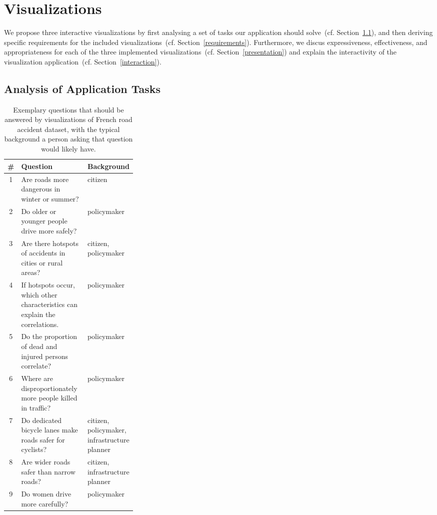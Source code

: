 \section{Visualizations}
\label{visualizations}
We propose three interactive visualizations by first analysing a set of tasks our application should solve~(cf. Section~\ref{tasks}), and then deriving specific requirements for the included visualizations~(cf. Section~\ref{requirements}). Furthermore, we discus expressiveness, effectiveness, and appropriateness for each of the three implemented visualizations~(cf. Section~\ref{presentation}) and explain the interactivity of the visualization application~(cf. Section~\ref{interaction}).

\subsection{Analysis of Application Tasks}
\label{tasks}
\begin{table}
    \caption{Exemplary questions that should be answered by visualizations of French road accident dataset, with the typical background a person asking that question would likely have.}
    \label{table-questions}
    \begin{tabularx}{\linewidth}{cXp{0.3\linewidth}}
        \toprule
        \textbf{\#} & \textbf{Question} & \textbf{Background} \\
        \midrule
        1 & Are roads more dangerous in winter or summer? & citizen \\
        2 & Do older or younger people drive more safely? & policymaker \\
        3 & Are there hotspots of accidents in cities or rural areas? & citizen, policymaker \\
        4 & If hotspots occur, which other characteristics can explain the correlations. & policymaker \\
        5 & Do the proportion of dead and injured persons correlate? & policymaker \\
        6 & Where are disproportionately more people killed in traffic? & policymaker \\
        7 & Do dedicated bicycle lanes make roads safer for cyclists? & citizen, policymaker, infrastructure planner \\
        8 & Are wider roads safer than narrow roads? & citizen, infrastructure planner \\
        9 & Do women drive more carefully? & policymaker \\
        \bottomrule
    \end{tabularx}
\end{table}
